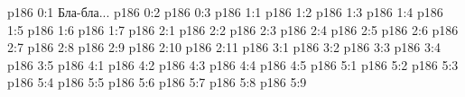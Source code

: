 \author{Промежуточные создания}
\vs p186 0:1  Бла-бла...
\vs p186 0:2 
\vs p186 0:3 
\vs p186 1:1 
\vs p186 1:2 
\vs p186 1:3 
\vs p186 1:4 
\vs p186 1:5 
\vs p186 1:6 
\vs p186 1:7 
\vs p186 2:1 
\vs p186 2:2 
\vs p186 2:3 
\vs p186 2:4 \pc 
\vs p186 2:5 \pc 
\vs p186 2:6 
\vs p186 2:7 
\vs p186 2:8 
\vs p186 2:9 
\vs p186 2:10 
\vs p186 2:11 
\vs p186 3:1 
\vs p186 3:2 
\vs p186 3:3 
\vs p186 3:4 
\vs p186 3:5 
\vs p186 4:1 
\vs p186 4:2 
\vs p186 4:3 
\vs p186 4:4 
\vs p186 4:5 
\vs p186 5:1 
\vs p186 5:2 
\vs p186 5:3 
\vs p186 5:4 
\vs p186 5:5 
\vs p186 5:6 
\vs p186 5:7 
\vs p186 5:8 
\vs p186 5:9 
\quizlink
